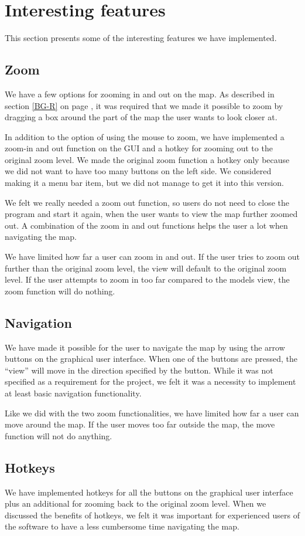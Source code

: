 \section{Interesting features}
\label{UIA-IF}
This section presents some of the interesting features we have implemented.
\subsection{Zoom}
\label{UIA-IF-Z}
We have a few options for zooming in and out on the map. As described in
section \ref{BG-R}  on page \pageref{BG-R}, it
was required that we made it possible to zoom by dragging a box around the part 
of the map the user wants to look closer at.

In addition to the option of using the mouse to zoom, we have implemented a
zoom-in and out function on the GUI and a hotkey for zooming out to the original
zoom level. We made the original zoom function a hotkey only because we did not
want to have too many buttons on the left side. We considered making it a menu bar
item, but we did not manage to get it into this version.

We felt we really needed a zoom out function, so users do not need to close the
program and start it again, when the user wants to view the map further zoomed
out. A combination of the zoom in and out functions helps the user a lot when
navigating the map.

We have limited how far a user can zoom in and out. If the user tries to zoom
out further than the original zoom level, the view will default to the original
zoom level. If the user attempts to zoom in too far compared to the models view,
the zoom function will do nothing.
\subsection{Navigation}
\label{UIA-IF-N}
We have made it possible for the user to navigate the map by using the arrow
buttons on the graphical user interface. When one of the buttons are pressed,
the ``view'' will move in the direction specified by the button. While it was
not specified as a requirement for the project, we felt it was a necessity to
implement at least basic navigation functionality.

Like we did with the two zoom functionalities, we have limited how far a user
can move around the map. If the user moves too far outside the map, the move
function will not do anything.
\subsection{Hotkeys}
\label{UIA-IF-H}
We have implemented hotkeys for all the buttons on the graphical user interface
plus an additional for zooming back to the original zoom level. When we
discussed the benefits of hotkeys, we felt it was important for experienced users of the
software to have a less cumbersome time navigating the map. 

